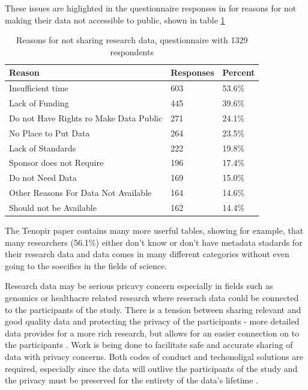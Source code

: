 These issues are higlighted in the questionnaire responses in
\cite{tenopir2011data} for reasons for not making their data not accessible
to public, shown in table \ref{table:reasons_not_sharing}

\begin{table}[h]
    \centering
    \caption{Reasons for not sharing research data, questionnaire with 1329
    respondents \cite{tenopir2011data}}
    \label{table:reasons_not_sharing}
    \begin{tabular}{| l | l | l |}
      \hline
      \textbf{Reason}                           & \textbf{Responses}    & \textbf{Percent} \\
      \hline
      \rowcolor{Gray}
      Insufficient time                         & 603                   & 53.6\% \\
      \hline
      Lack of Funding                           & 445                   & 39.6\% \\
      \hline
      \rowcolor{Gray}
      Do not Have Rights ro Make Data Public    & 271                   & 24.1\% \\
      \hline
      No Place to Put Data                      & 264                   & 23.5\% \\
      \hline
      \rowcolor{Gray}
      Lack of Standards                         & 222                   & 19.8\% \\
      \hline
      Sponsor does not Require                  & 196                   & 17.4\% \\
      \hline
      \rowcolor{Gray}
      Do not Need Data                          & 169                   & 15.0\% \\
      \hline
      Other Reasons For Data Not Available      & 164                   & 14.6\% \\
      \hline
      \rowcolor{Gray}
      Should not be Available                   & 162                   & 14.4\% \\
      \hline
    \end{tabular}
\end{table}

The Tenopir paper \cite{tenopir2011data} contains many more userful tables,
showing for example, that many researchers (56.1\%) either don't know or don't have
metadata stadards for their research data and data comes in many different
categories without even going to the soecifics in the fields of science.

Research data may be serious pricavy concern especially in fields such as
genomics or healthacre related research where reserach data could be connected
to the participants of the study. There is a tension between sharing relevant
and good quality data and protecting the privacy of the participants - more
detailed data provides for a more rich research, but allows for an easier
connection on to the participants \cite{kaye2012tension}. Work is being done
to facilitate safe and accurate sharing of data with privacy concerns. Both
codes of conduct and techonoligal solutions are required, especially since the
data will outlive the participants of the study and the privacy must be
preserved for the entirety of the data's lifetime
\cite{DBLP:journals/jam/NohCJ14a} \cite{knoppers2011towards}.

